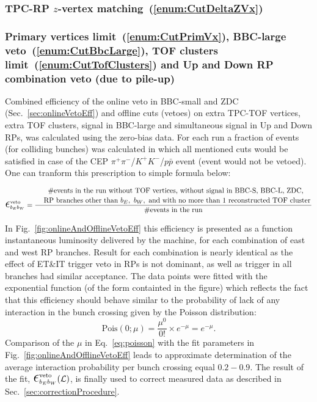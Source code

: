 \subsubsection{TPC-RP \texorpdfstring{$z$}{z}-vertex matching~(\ref{enum:CutDeltaZVx})}
\subsubsection{Primary vertices limit~(\ref{enum:CutPrimVx}), BBC-large veto~(\ref{enum:CutBbcLarge}), TOF clusters limit~(\ref{enum:CutTofClusters}) and Up and Down RP combination veto (due to pile-up)}\label{sec:onlineAndOfflineVetoEff}

Combined efficiency of the online veto in BBC-small and ZDC (Sec.~\ref{sec:onlineVetoEff}) and offline cuts (vetoes) on extra TPC-TOF vertices, extra TOF clusters, signal in BBC-large and simultaneous signal in Up and Down RPs, was calculated using the zero-bias data. For each run a fraction of events (for colliding bunches) was calculated in which all mentioned cuts would be satisfied in case of the CEP $\pi^{+}\pi^{-}$/$K^{+}K^{-}$/$p\bar{p}$ event (event would not be vetoed). One can tranform this prescription to simple formula below:

\begin{equation}
 \mbox{\LARGE$\epsilon$}^{\text{veto}}_{b_{E}b_{W}}=\dfrac{\splitdfrac{~~~~~\text{\#events in the run without TOF vertices, without signal in BBC-S, BBC-L, ZDC,}}{\text{RP branches other than} ~b_{E},~b_{W},~\text{and with no more than 1 reconstructed TOF cluster}}}{\text{\#events in the run}}
\end{equation}

In Fig.~\ref{fig:onlineAndOfflineVetoEff} this efficiency is presented as a function instantaneous luminosity delivered by the machine, for each combination of east and west RP branches. Result for each combination is nearly identical as the effect of ET\&IT trigger veto in RPs is not dominant, as well as trigger in all branches had similar acceptance. The data points were fitted with the exponential function (of the form containted in the figure) which reflects the fact that this efficiency should behave similar to the probability of lack of any interaction in the bunch crossing given by the Poisson distribution:
\begin{equation}\label{eq:poisson}
 \text{Pois}(0;\mu) = \frac{\mu^{0}}{0!} \times e^{-\mu} = e^{-\mu}.
\end{equation}
Comparison of the $\mu$ in Eq.~\eqref{eq:poisson} with the fit parameters in Fig.~\ref{fig:onlineAndOfflineVetoEff} leads to approximate determination of the average interaction probability per bunch crossing equal $0.2-0.9$. The result of the fit, $ \mbox{\LARGE$\epsilon$}^{\text{veto}}_{b_{E}b_{W}}(\mathcal{L})$, is finally used to correct measured data as described in Sec.~\ref{sec:correctionProcedure}. 

